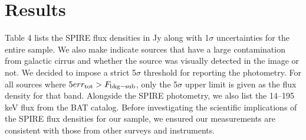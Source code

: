 \section{Results}
Table 4 lists the SPIRE flux densities in Jy along with 1$\sigma$ uncertainties for the entire sample. We also make indicate sources that have a large contamination from galactic cirrus and whether the source was visually detected in the image or not. We decided to impose a strict 5$\sigma$ threshold for reporting the photometry. For all sources where $5 err_{\rm{tot}} > F_{\rm{bkg-sub}}$, only the 5$\sigma$ upper limit is given as the flux density for that band. Alongside the SPIRE photometry, we also list the 14--195 keV flux from the BAT catalog. Before investigating the scientific implications of the SPIRE flux densities for our sample, we ensured our measurements are consistent with those from other surveys and instruments.